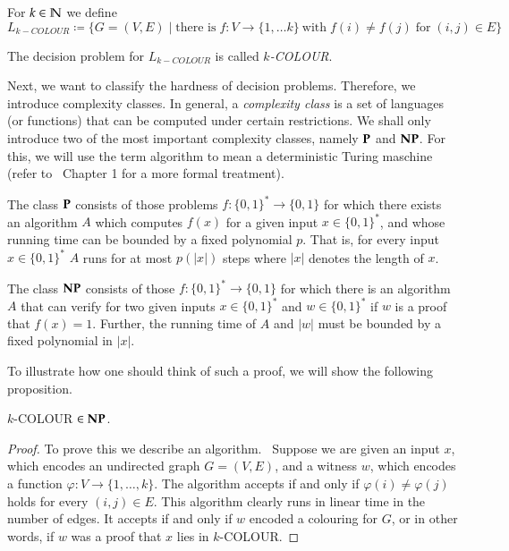 \begin{Problem}[$k$-COLOUR]
 For $k \in \mathbb{N}$ we define $$L_{k-COLOUR} \coloneqq \lbrace G  = (V,E) \; | 
 \; \text{there is} \; f \colon V \to \lbrace 1, \dotsc k \rbrace
 \ \text{with} \; f(i) \neq f(j) \; \text{for} \; (i,j) \in E \rbrace $$
 
 The decision problem for $L_{k-COLOUR}$ is called \emph{$k$-COLOUR}.
\end{Problem}

Next, we want to classify the hardness of decision problems. Therefore, we introduce complexity classes. 
 In general, a \emph{complexity class}
 is a set of languages (or functions) that can be computed under certain restrictions. We shall only introduce two 
 of the most important complexity classes, namely $\mathbf{P}$ and $\mathbf{NP}$. For this, we will use the term algorithm
 to mean a deterministic Turing maschine (refer to~\cite{Arora2009} Chapter 1 for a more formal treatment). 
 
\begin{Definition}
 The class $\mathbf{P}$ consists of those problems $f \colon {\lbrace 0,1 \rbrace}^* \to {\lbrace 0,1 \rbrace}$ for
 which there exists an algorithm $A$ which computes $f(x)$ for a given input $x \in {\lbrace 0,1 \rbrace}^*$, 
 and whose running time can be bounded by a fixed polynomial $p$. That is,
 for every input $x \in {\lbrace 0,1 \rbrace}^*$ $A$ runs for at most $p(|x|)$ steps where $|x|$ denotes the length of $x$.
\end{Definition}


\begin{Definition}
 The class $\mathbf{NP}$ consists of those $f \colon {\lbrace 0,1 \rbrace}^* \to {\lbrace 0,1 \rbrace}$ for which there is
 an algorithm $A$ that can verify for two given inputs $x \in {\lbrace 0,1 \rbrace}^*$ and 
 $w \in {\lbrace 0,1 \rbrace}^*$ if $w$ is a proof
 that $f(x) = 1$. Further, the running time of $A$ and $|w|$ must be bounded by a fixed polynomial in  $|x|$.
\end{Definition}


To illustrate how one should think of such a proof, we will show the following proposition.

\begin{Proposition}
 $k$-COLOUR $\in \mathbf{NP}$.
\end{Proposition}

\begin{proof}
 To prove this we describe an algorithm. \
 Suppose we are given an input $x$, which encodes an undirected graph $G = (V,E)$, and a witness $w$, which encodes a 
 function $\varphi \colon V \to \lbrace 1, \dotsc, k \rbrace$.  The algorithm accepts if and only if $\varphi(i) \neq \varphi(j)$ holds
 for every $(i,j) \in E$.
 This algorithm clearly runs in linear time in the number of edges. It accepts if and only if
 $w$ encoded a  colouring for $G$, or in other words, if
 $w$ was a proof that $x$ lies in $k$-COLOUR.
\end{proof}

